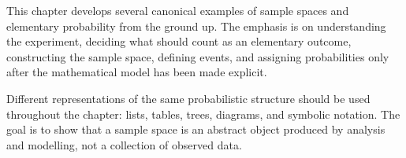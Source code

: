 This chapter develops several canonical examples of sample spaces and elementary probability from the ground up. The emphasis is on understanding the experiment, deciding what should count as an elementary outcome, constructing the sample space, defining events, and assigning probabilities only after the mathematical model has been made explicit.

Different representations of the same probabilistic structure should be used throughout the chapter: lists, tables, trees, diagrams, and symbolic notation. The goal is to show that a sample space is an abstract object produced by analysis and modelling, not a collection of observed data.
